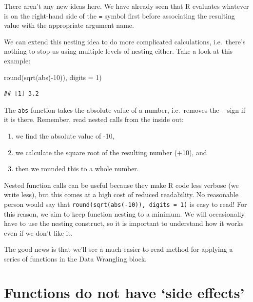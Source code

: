 \documentclass[
]{book}
\newenvironment{Shaded}{\begin{snugshade}}{\end{snugshade}}
\newcommand{\AttributeTok}[1]{\textcolor[rgb]{0.77,0.63,0.00}{#1}}
\newcommand{\DecValTok}[1]{\textcolor[rgb]{0.00,0.00,0.81}{#1}}
\newcommand{\FunctionTok}[1]{\textcolor[rgb]{0.00,0.00,0.00}{#1}}
\newcommand{\NormalTok}[1]{#1}
\newcommand{\SpecialCharTok}[1]{\textcolor[rgb]{0.00,0.00,0.00}{#1}}
\providecommand{\tightlist}{%
  \setlength{\itemsep}{0pt}\setlength{\parskip}{0pt}}
\begin{document}
There aren't any new ideas here. We have already seen that R evaluates whatever is on the right-hand side of the \texttt{=} symbol first before associating the resulting value with the appropriate argument name.

We can extend this nesting idea to do more complicated calculations, i.e.~there's nothing to stop us using multiple levels of nesting either. Take a look at this example:

\begin{Shaded}
\begin{Highlighting}[]
\FunctionTok{round}\NormalTok{(}\FunctionTok{sqrt}\NormalTok{(}\FunctionTok{abs}\NormalTok{(}\SpecialCharTok{{-}}\DecValTok{10}\NormalTok{)), }\AttributeTok{digits =} \DecValTok{1}\NormalTok{)}
\end{Highlighting}
\end{Shaded}

\begin{verbatim}
## [1] 3.2
\end{verbatim}

The \texttt{abs} function takes the absolute value of a number, i.e.~removes the \texttt{-} sign if it is there. Remember, read nested calls from the inside out:

\begin{enumerate}
\def\labelenumi{\arabic{enumi}.}
\tightlist
\item
  we find the absolute value of -10,
\item
  we calculate the square root of the resulting number (+10), and
\item
  then we rounded this to a whole number.
\end{enumerate}

Nested function calls can be useful because they make R code less verbose (we write less), but this comes at a high cost of reduced readability. No reasonable person would say that \texttt{round(sqrt(abs(-10)),\ digits\ =\ 1)} is easy to read! For this reason, we aim to keep function nesting to a minimum. We will occasionally have to use the nesting construct, so it is important to understand how it works even if we don't like it.

The good news is that we'll see a much-easier-to-read method for applying a series of functions in the Data Wrangling block.

\hypertarget{functions-do-not-have-side-effects}{%
\section{Functions do not have `side effects'}\label{functions-do-not-have-side-effects}}
\end{document}
